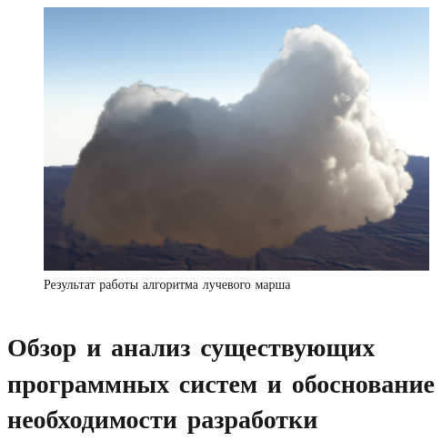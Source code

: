 \begin{figure}[H]
    \centering
    \includegraphics[scale=0.4]{img/raymach.png}
    \caption{Результат работы алгоритма лучевого марша}
    \label{img:raymach}
\end{figure}

\section{Обзор и анализ существующих программных систем и обоснование необходимости разработки}
